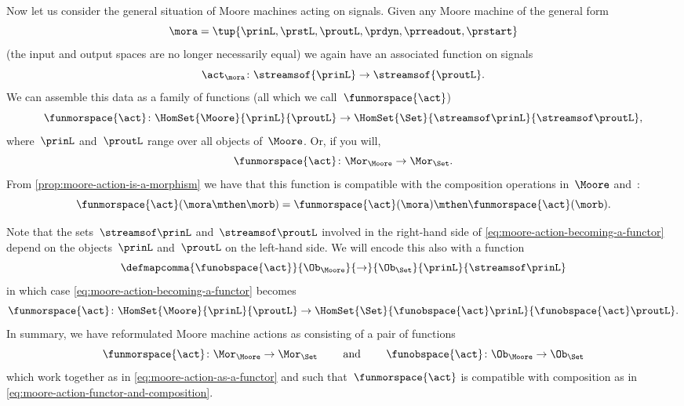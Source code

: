Now let us consider the general situation of Moore machines acting on signals.
Given any Moore machine of the general form
\begin{equation}
    \mora = \tup{\prinL,\prstL,\proutL,\prdyn,\prreadout,\prstart}
\end{equation}
(the input and output spaces are no longer necessarily equal) we again have an associated function on signals
\begin{equation}
    \act_{\mora} \colon \streamsof{\prinL} \to \streamsof {\proutL}.
\end{equation}
We can assemble this data as a family of functions (all which we call~$\funmorspace{\act}$)
\begin{equation}
    \label{eq:moore-action-becoming-a-functor}
    \funmorspace{\act} \colon  \HomSet{\Moore}{\prinL}{\proutL} \to \HomSet{\Set}{\streamsof\prinL}{\streamsof\proutL},
\end{equation}
where~$\prinL$ and~$\proutL$ range over all objects of~$\Moore$.
Or, if you will,
\begin{equation}
    \funmorspace{\act} \colon \Mor_\Moore \to \Mor_\Set.
\end{equation}
From \cref{prop:moore-action-is-a-morphism} we have that this function is compatible with the composition operations in~$\Moore$ and~\Set:
\begin{equation}
    \label{eq:moore-action-functor-and-composition}
    \funmorspace{\act}(\mora \mthen \morb) = \funmorspace{\act}(\mora) \mthen \funmorspace{\act}(\morb).
\end{equation}

Note that the sets~$\streamsof\prinL$ and~$\streamsof\proutL$ involved in the right-hand side of \cref{eq:moore-action-becoming-a-functor} depend on the objects~$\prinL$ and~$\proutL$ on the left-hand side.
We will encode this also with a function
\begin{equation}
    \defmapcomma{\funobspace{\act}}
    {\Ob_{\Moore}}
    {\to}
    {\Ob_{\Set}}
    {\prinL}
    {\streamsof\prinL}
\end{equation}
in which case \cref{eq:moore-action-becoming-a-functor} becomes
\begin{equation}
    \label{eq:moore-action-as-a-functor}
    \funmorspace{\act} \colon  \HomSet{\Moore}{\prinL}{\proutL} \to \HomSet{\Set}{ \funobspace{\act}\prinL}{\funobspace{\act}\proutL}.
\end{equation}
%
In summary, we have reformulated Moore machine actions as consisting of a pair of functions
\begin{equation}
    \funmorspace{\act} \colon \Mor_\Moore \to \Mor_\Set \qquad \text{ and } \qquad \funobspace{\act} \colon \Ob_{\Moore} \to \Ob_{\Set}
\end{equation}
which work together as in \cref{eq:moore-action-as-a-functor} and such that~$\funmorspace{\act}$ is compatible with composition as in \cref{eq:moore-action-functor-and-composition}.

